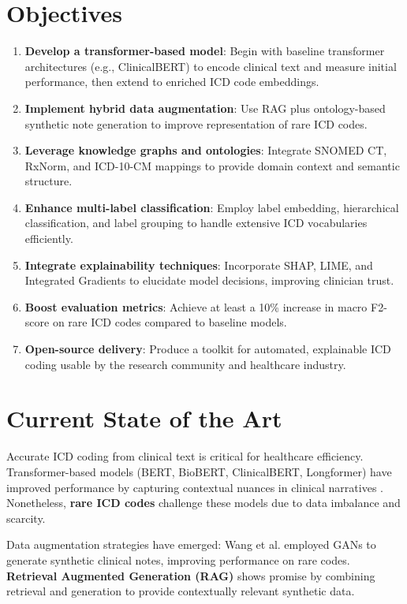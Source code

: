 \documentclass[10pt,a4paper]{article}
\begin{document}
\section{Objectives}
\begin{enumerate}
    \item \textbf{Develop a transformer-based model}: Begin with baseline transformer architectures (e.g., ClinicalBERT) to encode clinical text and measure initial performance, then extend to enriched ICD code embeddings.
    \item \textbf{Implement hybrid data augmentation}: Use RAG plus ontology-based synthetic note generation to improve representation of rare ICD codes.
    \item \textbf{Leverage knowledge graphs and ontologies}: Integrate SNOMED CT, RxNorm, and ICD-10-CM mappings to provide domain context and semantic structure.
    \item \textbf{Enhance multi-label classification}: Employ label embedding, hierarchical classification, and label grouping to handle extensive ICD vocabularies efficiently.
    \item \textbf{Integrate explainability techniques}: Incorporate SHAP, LIME, and Integrated Gradients to elucidate model decisions, improving clinician trust.
    \item \textbf{Boost evaluation metrics}: Achieve at least a 10\% increase in macro F2-score on rare ICD codes compared to baseline models.
    \item \textbf{Open-source delivery}: Produce a toolkit for automated, explainable ICD coding usable by the research community and healthcare industry.
\end{enumerate}

\section{Current State of the Art}
Accurate ICD coding from clinical text is critical for healthcare efficiency. Transformer-based models (BERT, BioBERT, ClinicalBERT, Longformer) have improved performance by capturing contextual nuances in clinical narratives \cite{si2019enhancing, sheu2022survey}. Nonetheless, \textbf{rare ICD codes} challenge these models due to data imbalance and scarcity.

Data augmentation strategies have emerged: Wang et al. \cite{wang2019clinical} employed GANs to generate synthetic clinical notes, improving performance on rare codes. \textbf{Retrieval Augmented Generation (RAG)} shows promise by combining retrieval and generation to provide contextually relevant synthetic data.
\end{document}

